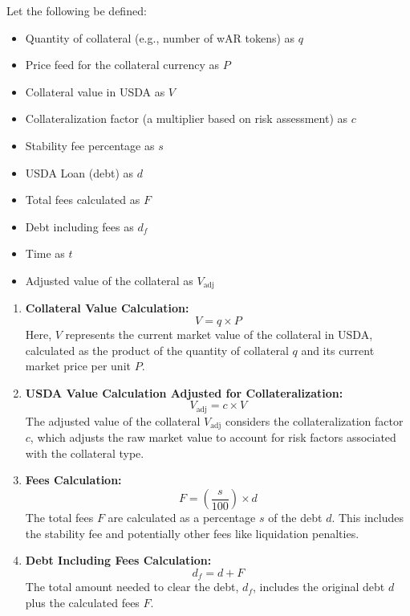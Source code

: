 Let the following be defined:
\begin{itemize}
    \item Quantity of collateral (e.g., number of wAR tokens) as \( q \)
    \item Price feed for the collateral currency as \( P \)
    \item Collateral value in USDA as \( V \)
    \item Collateralization factor (a multiplier based on risk assessment) as \( c \)
    \item Stability fee percentage as \( s \)
    \item USDA Loan (debt) as \( d \)
    \item Total fees calculated as \( F \)
    \item Debt including fees as \( d_f \)
    \item Time as \( t \)
    \item Adjusted value of the collateral as \( V_{\text{adj}} \)
\end{itemize}
\newpage
\begin{enumerate}
    \item \textbf{Collateral Value Calculation:}
    \[
    V = q \times P
    \]
    Here, \( V \) represents the current market value of the collateral in USDA, calculated as the product of the quantity of collateral \( q \) and its current market price per unit \( P \).

    \item \textbf{USDA Value Calculation Adjusted for Collateralization:}
    \[
    V_{\text{adj}} = c \times V
    \]
    The adjusted value of the collateral \( V_{\text{adj}} \) considers the collateralization factor \( c \), which adjusts the raw market value to account for risk factors associated with the collateral type.

    \item \textbf{Fees Calculation:}
    \[
    F = \left( \frac{s}{100} \right) \times d
    \]
    The total fees \( F \) are calculated as a percentage \( s \) of the debt \( d \). This includes the stability fee and potentially other fees like liquidation penalties.

    \item \textbf{Debt Including Fees Calculation:}
    \[
    d_f = d + F
    \]
    The total amount needed to clear the debt, \( d_f \), includes the original debt \( d \) plus the calculated fees \( F \).
\end{enumerate}


